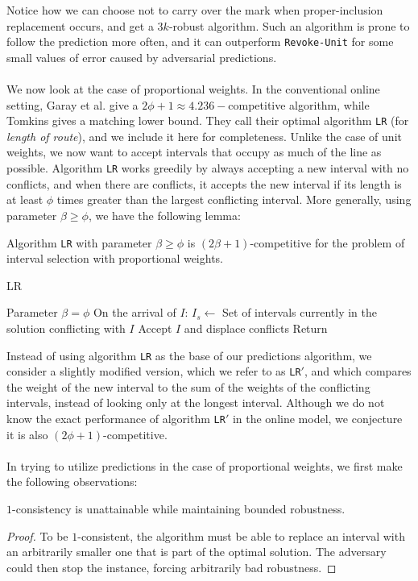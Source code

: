 Notice how we can choose not to carry over the mark when proper-inclusion replacement occurs, and get a $3k$-robust algorithm. Such an algorithm is prone to follow the prediction more often, and it can outperform \texttt{Revoke-Unit} for some small values of error caused by adversarial predictions.\\\\
We now look at the case of proportional weights. In the conventional online setting, Garay et al. \cite{garay1997efficient} give a $2\phi + 1  \approx 4.236-$competitive algorithm, while Tomkins \cite{tomkins1995lower} gives a matching lower bound. They call their optimal algorithm \texttt{LR} (for \textit{length of route}), and we include it here for completeness. Unlike the case of unit weights, we now want to accept intervals that occupy as much of the line as possible. Algorithm \texttt{LR} works greedily by always accepting a new interval with no conflicts, and when there are conflicts, it accepts the new interval if its length is at least $\phi$ times greater than the largest conflicting interval. More generally, using parameter $\beta \geq \phi$, we have the following lemma:
\begin{lemma}
    Algorithm \texttt{LR} with parameter $\beta \geq \phi$ is $(2\beta + 1)$-competitive for the problem of interval selection with proportional weights.
\end{lemma}
\begin{algorithm}
\caption{LR \cite{garay1997efficient}}\label{alg:garay_prop}
\begin{algorithmic}
\State Parameter $\beta = \phi$ 
\State On the arrival of $I$:
\State $I_{s} \gets $ Set of intervals currently in the solution conflicting with $I$
    \State Accept $I$ and displace conflicts
    \State Return
\EndIf
\end{algorithmic}
\end{algorithm}
Instead of using algorithm \texttt{LR} as the base of our predictions algorithm, we consider a slightly modified version, which we refer to as \texttt{LR$'$}, and which compares the weight of the new interval to the sum of the weights of the conflicting intervals, instead of looking only at the longest interval. Although we do not know the exact performance of algorithm \texttt{LR$'$} in the online model, we conjecture it is also $(2\phi + 1)$-competitive.\\\\
In trying to utilize predictions in the case of proportional weights, we first make the following observations:
\begin{observation}
    $1$-consistency is unattainable while maintaining bounded robustness.
\end{observation}
\begin{proof}
    To be $1$-consistent, the algorithm must be able to replace an interval with an arbitrarily smaller one that is part of the optimal solution. The adversary could then stop the instance, forcing arbitrarily bad robustness.
\end{proof}

